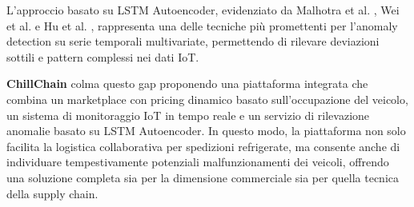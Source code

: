 L’approccio basato su LSTM Autoencoder, evidenziato da Malhotra et al. \cite{malhotra2016}, Wei et al. \cite{wei2022lstmiaq} e Hu et al. \cite{hu2020sensors}, rappresenta una delle tecniche più promettenti per l’anomaly detection su serie temporali multivariate, permettendo di rilevare deviazioni sottili e pattern complessi nei dati IoT.

\textbf{ChillChain} colma questo gap proponendo una piattaforma integrata che combina un marketplace con pricing dinamico basato sull’occupazione del veicolo, un sistema di monitoraggio IoT in tempo reale e un servizio di rilevazione anomalie basato su LSTM Autoencoder. In questo modo, la piattaforma non solo facilita la logistica collaborativa per spedizioni refrigerate, ma consente anche di individuare tempestivamente potenziali malfunzionamenti dei veicoli, offrendo una soluzione completa sia per la dimensione commerciale sia per quella tecnica della supply chain.